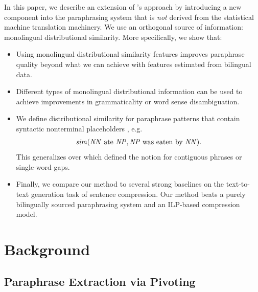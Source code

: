 \documentclass[11pt]{article}
\begin{document}
In this paper, we describe an extension of
's approach by introducing a new component
into the paraphrasing system that is \emph{not} derived from the
statistical machine translation machinery. We use an orthogonal source
of information: monolingual distributional similarity. More
specifically, we show that:
\begin{itemize}
\item Using monolingual distributional similarity features improves
  paraphrase quality beyond what we can achieve with features estimated
  from bilingual data. 

\item Different types of monolingual distributional information can be
  used to achieve improvements in grammaticality or word sense
  disambiguation.

\item We define distributional similarity for paraphrase patterns that
  contain syntactic nonterminal placeholders , e.g.  \vspace{-6pt}
  \begin{equation*}\mathit{sim}(\mathit{NN}\text{ ate
    }\mathit{NP}, \mathit{NP}\text{ was eaten by }\mathit{NN} ).  \vspace{-2pt}
  \end{equation*} 
  This generalizes over  which defined the notion
  for contiguous phrases or single-word gaps.

\item Finally, we compare our method to several strong baselines on
  the text-to-text generation task of sentence compression. Our method
  beats a purely bilingually sourced paraphrasing system and an
  ILP-based compression model.
\end{itemize}

\section{Background}

\subsection{Paraphrase Extraction via Pivoting}
\label{sec-scfgs}
\end{document}
